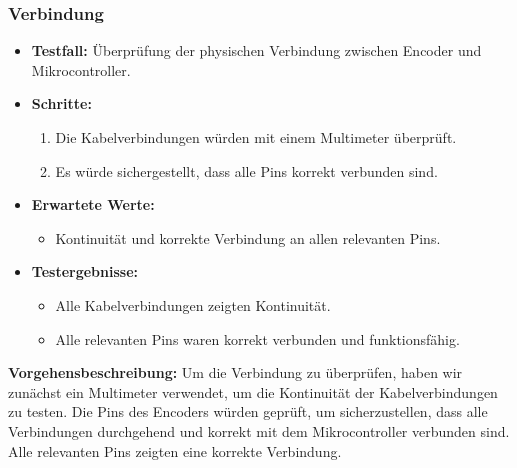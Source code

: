 \subsubsection{Verbindung}
\begin{itemize}
    \item \textbf{Testfall:} Überprüfung der physischen Verbindung zwischen Encoder und Mikrocontroller.
    \item \textbf{Schritte:}
    \begin{enumerate}
        \item Die Kabelverbindungen würden mit einem Multimeter überprüft.
        \item Es würde sichergestellt, dass alle Pins korrekt verbunden sind.
    \end{enumerate}
    \item \textbf{Erwartete Werte:}
    \begin{itemize}
        \item Kontinuität und korrekte Verbindung an allen relevanten Pins.
    \end{itemize}
    \item \textbf{Testergebnisse:}
    \begin{itemize}
        \item Alle Kabelverbindungen zeigten Kontinuität.
        \item Alle relevanten Pins waren korrekt verbunden und funktionsfähig.
    \end{itemize}
\end{itemize}


\textbf{Vorgehensbeschreibung:}
Um die Verbindung zu überprüfen, haben wir zunächst ein Multimeter verwendet, um die Kontinuität der Kabelverbindungen zu testen. Die Pins des Encoders würden geprüft, um sicherzustellen, dass alle Verbindungen durchgehend und korrekt mit dem Mikrocontroller verbunden sind. Alle relevanten Pins zeigten eine korrekte Verbindung.

